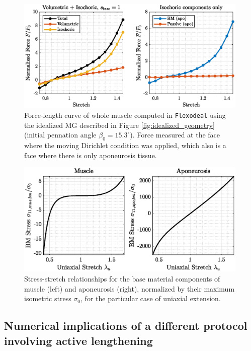 \documentclass{sfuthesis}
\numberwithin{equation}{section}
\numberwithin{figure}{chapter}
\numberwithin{table}{chapter}
\theoremstyle{definition}
\begin{document}
\begin{figure}
    \centering
    \includegraphics[width=0.99\textwidth]{fl_curve_flexodeal_full_apo_thin.eps}
    \caption{Force-length curve of whole muscle computed in \texttt{Flexodeal} using the idealized MG described in Figure \ref{fig:idealized_geometry} (initial pennation angle $\beta_0 = 15.3^\circ$). Force measured at the face where the moving Dirichlet condition was applied, which also is a face where there is only aponeurosis tissue.\label{fig:fl-curve-apo}}
\end{figure}

\begin{figure}
    \centering
    \includegraphics[width=0.99\textwidth]{uniaxial_stress_bm.eps}
    \caption{Stress-stretch relationships for the base material components of muscle (left) and aponeurosis (right), normalized by their maximum isometric stress $\sigma_0$, for the particular case of uniaxial extension.
    \label{fig:uniaxial_extension_bm}}
\end{figure}


\subsection{Numerical implications of a different protocol involving active lengthening}
\end{document}
